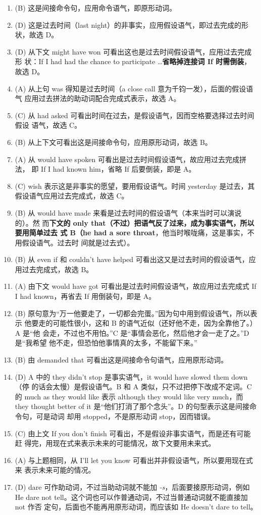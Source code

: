 \documentclass{yufa}
\begin{document}
\begin{enumerate}
\item (B) 这是间接命令句，应用命令语气，即原形动词。
\item (D) 这是过去时间（last night）的非事实，应用假设语气，即过去完成的形状，故选 D。
\item (D) 从下文 might have won 可看出这也是过去时间假设语气，应用过去完成形
  状：If I had had the chance to participate \ldots \textbf{省略掉连接词 If 时需倒装}，
  故选 D。

\item (A) 从上句 was 得知是过去时间（a close call 意为千钧一发），后面的假设语气
  应用过去拼法的助动词配合完成式表示，故选 A。
\item (C) 从 had asked 可看出时间在过去，是假设语气，因而空格要选择过去时间假设
  语气，故选 C。
\item (B) 从上下文可看出这是间接命令句，应用原形动词，故选 B。
\item (A) 从 would have spoken 可看出是过去时间假设语气，故应用过去完成拼法，
  即 If I had known him，省略 If 后要倒装，即是 A。
\item (C) wish 表示这是非事实的愿望，要用假设语气。时间 yesterday 是过去，其假设语气应用过去完成式，故选 C。

\item (B) 从 would have made 来看是过去时间的假设语气（本来当时可以演说的）。然
  而\textbf{下文的 only that（不过）把语气反了过来，成为事实语气，所以要用简单过去
    式 B（he had a sore throat}，他当时喉咙痛，这是事实，不用假设语气。过去时
  间就是过去式）。
\item (B) 从 even if 和 couldn't have helped 可看出这又是过去时间的假设语气，应
  用过去完成式，故选 B。
\item (A) 由下文 would have got 可看出是过去时间假设语气，故应用过去完成式 If I
  had known，再省去 If 用倒装句，即是 A。
\item (B) 原句意为“万一他要走了，一切都会完蛋。”因为句中用到假设语气，所以表示
  他要走的可能性很小，这和 B 的语气近似（还好他不走，因为全靠他了。）A 是“他
  会走，不过也不用怕。”C 是“事情会恶化，然后他才会一走了之。”D 是“我希望
  他不走，但恐怕他事情真的太多，不能留下来。”
\item (B) 由 demanded that 可看出这是间接命令句语气，应用原形动词。
\item (D) A 中的 they didn't stop 是事实语气，it would have slowed them down（停
  的话会太慢）是假设语气。B 和 A 类似，只不过把停下改成不定词。C 的 much as
  they would like 表示 although they would like very much，而 they thought
  better of it 是“他们打消了那个念头”。D 的句型表示这是间接命令句，可是动词
  却用 stopped，不是原形动词 stop，因而错误。
\item (C) 由上文 If you don't finish 可看出，不是假设非事实语气，而是还有可能赶
  得完，用现在式来表示未来的可能情况，故下文要用未来式。
\item (A) 与上题相同，从 I'll let you know 可看出并非假设语气，所以要用现在式来
  表示未来可能的情况。
\item (D) dare 可作助动词，不过当助动词就不能加 \emph{-s}，后面要接原形动词，例如 He
  dare not tell。这个词也可以作普通动词，不过当普通动词就不能直接加 not 作否
  定句，后面也不能再用原形动词，而应该如 He doesn't dare to tell。


\end{enumerate}
\end{document}
